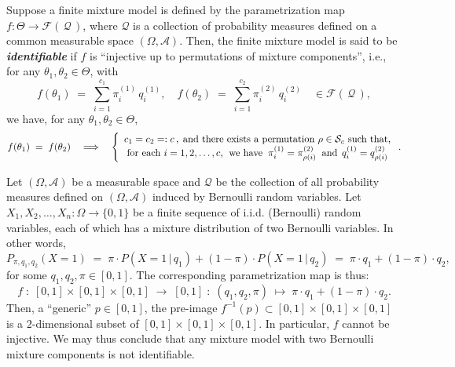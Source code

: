 \begin{definition}
\mbox{}\vskip 0.05cm
\noindent
Suppose a finite mixture model is defined by the parametrization map
$f : \Theta \longrightarrow \mathcal{F}\!\left(\,\mathcal{Q}\,\right)$,
where $\mathcal{Q}$ is a collection of probability measures
defined on a common measurable space $\left(\Omega,\mathcal{A}\right)$.
Then, the finite mixture model is said to be \textbf{\emph{identifiable}} if
$f$ is ``injective up to permutations of mixture components'',
i.e., for any $\theta_{1}, \theta_{2} \in \Theta$, with
\begin{equation*}
f(\theta_{1}) \;=\; \overset{c_{1}}{\underset{i=1}{\sum}}\pi^{(1)}_{i}\,q^{(1)}_{i},
\quad
f(\theta_{2}) \;=\; \overset{c_{2}}{\underset{i=1}{\sum}}\pi^{(2)}_{i}\,q^{(2)}_{i}
\quad
\in \mathcal{F}\!\left(\,\mathcal{Q}\,\right),
\end{equation*}
we have, for any $\theta_{1}, \theta_{2} \in \Theta$,
\begin{equation*}
f(\theta_{1}) \; = \; f(\theta_{2})
\quad\Longrightarrow\quad
\left\{\begin{array}{c}
	c_{1} = c_{2} =: c\,, \;\textnormal{and there exists a permutation $\rho \in \mathcal{S}_{c}$ such that,} \\
	\textnormal{for each $i = 1,2,\ldots,c$, \;we have}\;\;
	\pi^{(1)}_{i} = \pi^{(2)}_{\rho(i)}
	\;\;\textnormal{and}\;\,
	q^{(1)}_{i} = q^{(2)}_{\rho(i)}
\end{array}\right..
\end{equation*}
\end{definition}

\begin{example}
\mbox{}\vskip 0.05cm
\noindent
Let $\left(\Omega,\mathcal{A}\right)$ be a measurable space
and $\mathcal{Q}$ be the collection of all probability measures
defined on $\left(\Omega,\mathcal{A}\right)$ induced by Bernoulli random variables.
Let $X_{1}, X_{2}, \ldots, X_{n} : \Omega \longrightarrow \{0,1\}$
be a finite sequence of i.i.d. (Bernoulli) random variables,
each of which has a mixture distribution of two Bernoulli variables.
In other words,
\begin{equation*}
P_{\pi,q_{1},q_{2}}(X = 1)
\;=\; \pi \cdot P(X=1\,\vert\,q_{1}) + (1-\pi)\cdot P(X=1\,\vert\,q_{2})
\;=\; \pi \cdot q_{1} + (1-\pi)\cdot q_{2},
\end{equation*}
for some $q_{1}, q_{2},\pi \in [0,1]$.
The corresponding parametrization map is thus:
\begin{equation*}
f \;:\; [0,1] \times [0,1] \times [0,1] \;\longrightarrow\; [0,1]
\;:\; (q_{1},q_{2},\pi) \;\longmapsto\; \pi \cdot q_{1} + (1-\pi)\cdot q_{2}.
\end{equation*}
Then, a ``generic'' $p \in [0,1]$, the pre-image
$f^{-1}(p) \subset [0,1] \times [0,1] \times [0,1]$
is a $2$-dimensional subset of $[0,1] \times [0,1] \times [0,1]$.
In particular, $f$ cannot be injective.
We may thus conclude that any mixture model with two
Bernoulli mixture components is not identifiable.
\end{example}


